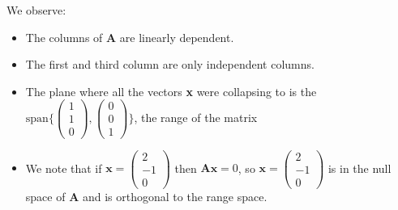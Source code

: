 We observe:
\begin{itemize}
    \item The columns of \textbf{A} are linearly dependent.
    \item The first and third column are only independent columns.
    \item The plane where all the vectors \textbf{x} were collapsing to is the $\text{span}\{ \begin{pmatrix}1\\1\\0\end{pmatrix},\begin{pmatrix}0\\0\\1\end{pmatrix}\}$, the range of the matrix
    \item We note that if $\mathbf{x} = \begin{pmatrix}
        2\\-1\\0
    \end{pmatrix}$ then $\mathbf{Ax} = 0$, so $\mathbf{x} = \begin{pmatrix}
        2\\-1\\0
    \end{pmatrix}$ is in the null space of \textbf{A} and is orthogonal to the range space.
\end{itemize}

